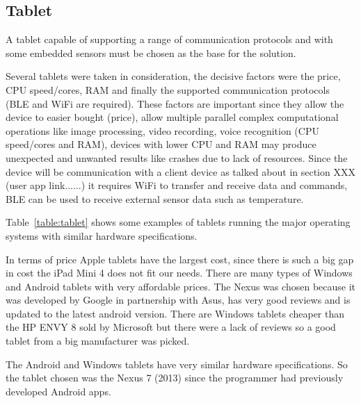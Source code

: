 \subsection{Tablet}

A tablet capable of supporting a range of communication protocols and with some embedded sensors must be chosen as the base for the solution.

Several tablets were taken in consideration, the decisive factors were the price, \ac{CPU} speed/cores, \ac{RAM} and finally the supported communication protocols (\ac{BLE} and \ac{WiFi} are required). These factors are important since they allow the device to easier bought (price), allow multiple parallel complex computational operations like image processing, video recording, voice recognition (\ac{CPU} speed/cores and \ac{RAM}), devices with lower \ac{CPU} and \ac{RAM} may produce unexpected and unwanted results like crashes due to lack of resources. Since the device will be communication with a client device as talked about in section XXX (user app link......) it requires \ac{WiFi} to transfer and receive data and commands, \ac{BLE} can be used to receive external sensor data such as temperature.


Table~\ref{table:tablet} shows some examples of tablets running the major operating systems with similar hardware specifications.

In terms of price Apple tablets have the largest cost, since there is such a big gap in cost the iPad Mini 4 does not fit our needs. There are many types of Windows and Android tablets with very affordable prices. The Nexus was chosen because it was developed by Google in partnership with Asus, has very good reviews and is updated to the latest android version. There are Windows tablets cheaper than the HP ENVY 8 sold by Microsoft but there were a lack of reviews so a good tablet from a big manufacturer was picked.

The Android and Windows tablets have very similar hardware specifications. So the tablet chosen was the Nexus 7 (2013) since the programmer had previously developed Android apps.


